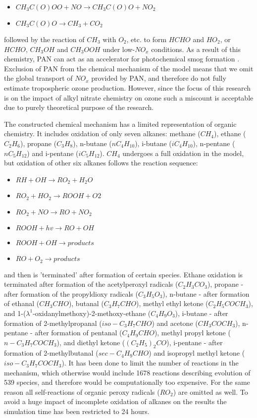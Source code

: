 \documentclass[11pt,a4paper]{article}
\begin{document}
\begin{itemize}
\begin{itemize}
\item[] $CH_3C(O)OO + NO \rightarrow CH_3C(O)O + NO_2$
\item[] $CH_3C(O)O \rightarrow CH_3 + CO_2$
\end{itemize}
followed by the reaction of $CH_3$ with $O_2$, etc. to form $HCHO$ and $HO_2$, or $HCHO$, $CH_3OH$ and $CH_3OOH$ under low-$NO_x$ conditions. As a result of this chemistry, PAN can act as an accelerator for photochemical smog formation \citep{Finlayson-Pitts2000}. Exclusion of PAN from the chemical mechanism of the model means that we omit the global transport of $NO_x$ provided by PAN, and therefore do not fully estimate tropospheric ozone production. However, since the focus of this research is on the impact of alkyl nitrate chemistry on ozone such a miscount is acceptable due to purely theoretical purpose of the research.
\end{itemize}

The constructed chemical mechanism has a limited representation of organic chemistry. It includes oxidation of only seven alkanes: methane ($CH_4$), ethane ($C_2H_6$), propane ($C_3H_8$), n-butane ($nC_4H_{10}$), i-butane ($iC_4H_{10}$), n-pentane ($nC_5H_{12}$) and i-pentane ($iC_5H_{12}$). $CH_4$ undergoes a full oxidation in the model, but oxidation of other six alkanes follows the reaction sequence:
\begin{itemize}
\item[] $RH + OH \rightarrow RO_2 + H_2O$
\item[] $RO_2 + HO_2 \rightarrow ROOH + O2$
\item[] $RO_2 + NO \rightarrow RO + NO_2$
\item[] $ROOH + hv \rightarrow RO + OH$
\item[] $ROOH + OH \rightarrow products$
\item[] $RO + O_2 \rightarrow products$
\end{itemize}
and then is 'terminated' after formation of certain species. Ethane oxidation is terminated after formation of the acetylperoxyl radicals ($C_2H_3CO_3$), propane - after formation of the propyldioxy radicals ($C_3H_5O_3$), n-butane - after formation of ethanal ($CH_3CHO$), butanal ($C_3H_7CHO$), methyl ethyl ketone ($C_2H_5COCH_3$), and 1-($\lambda^1$-oxidanylmethoxy)-2-methoxy-ethane ($C_4H_9O_3$), i-butane - after formation of 2-methylpropanal ($iso-C_3H_7CHO$) and acetone ($CH_3COCH_3$), n-pentane - after formation of pentanal ($C_4H_9CHO$), methyl propyl ketone ($n-C_3H_7COCH_3$), and diethyl ketone ($(C_2H_5)_2CO$), i-pentane - after formation of 2-methylbutanal ($sec-C_4H_9CHO$) and isopropyl methyl ketone ($iso-C_3H_7COCH_3$). It has been done to limit the number of reactions in the mechanism, which otherwise would include 1678 reactions describing evolution of 539 species, and therefore would be computationally too expensive. For the same reason all self-reactions of organic peroxy radicals ($RO_2$) are omitted as well. To avoid a huge impact of incomplete oxidation of alkanes on the results the simulation time has been restricted to 24 hours.
\end{document}

